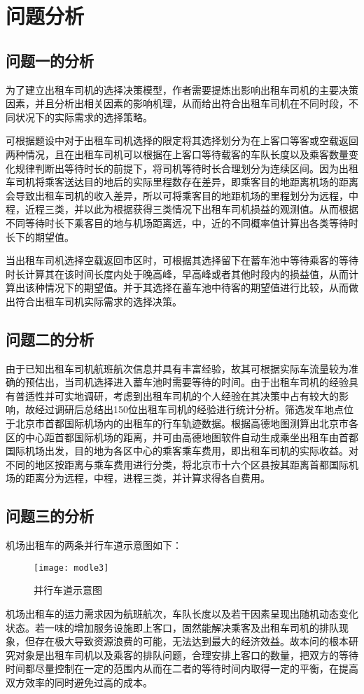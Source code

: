 \documentclass[withoutpreface,bwprint]{cumcmthesis} %
\begin{document}
\newpage
\section{问题分析}
\subsection{问题一的分析}
为了建立出租车司机的选择决策模型，作者需要提炼出影响出租车司机的主要决策因素，并且分析出相关因素的影响机理，从而给出符合出租车司机在不同时段，不同状况下的实际需求的选择策略。

可根据题设中对于出租车司机选择的限定将其选择划分为在上客口等客或空载返回两种情况，且在出租车司机可以根据在上客口等待载客的车队长度以及乘客数量变化规律判断出等待时长的前提下，将司机等待时长合理划分为连续区间。因为出租车司机将乘客送达目的地后的实际里程数存在差异，即乘客目的地距离机场的距离会导致出租车司机的收入差异，所以可将乘客目的地距机场的里程划分为远程，中程，近程三类，并以此为根据获得三类情况下出租车司机损益的观测值。从而根据不同等待时长下乘客目的地与机场距离远，中，近的不同概率值计算出各类等待时长下的期望值。

当出租车司机选择空载返回市区时，可根据其选择留下在蓄车池中等待乘客的等待时长计算其在该时间长度内处于晚高峰，早高峰或者其他时段内的损益值，从而计算出该种情况下的期望值。并于其选择在蓄车池中待客的期望值进行比较，从而做出符合出租车司机实际需求的选择决策。

\subsection{问题二的分析}
由于已知出租车司机航班航次信息并具有丰富经验，故其可根据实际车流量较为准确的预估出，当司机选择进入蓄车池时需要等待的时间。由于出租车司机的经验具有普适性并可实地调研，考虑到出租车司机的个人经验在其决策中占有较大的影响，故经过调研后总结出150位出租车司机的经验进行统计分析。筛选发车地点位于北京市首都国际机场内的出租车的行车轨迹数据。根据高德地图测算出北京市各区的中心距首都国际机场的距离，并可由高德地图软件自动生成乘坐出租车由首都国际机场出发，目的地为各区中心的乘客乘车费用，即出租车司机的实际收益。对不同的地区按距离与乘车费用进行分类，将北京市十六个区县按其距离首都国际机场的距离分为远程，中程，进程三类，并计算求得各自费用。

\subsection{问题三的分析}
机场出租车的两条并行车道示意图如下：

\begin{figure}[!htbp]
	\centering
	\texttt{[image: modle3]}
	\caption{并行车道示意图}
	\label{fig:circuit-diagram}
\end{figure}
\newpage
机场出租车的运力需求因为航班航次，车队长度以及若干因素呈现出随机动态变化状态。若一味的增加服务设施即上客口，固然能解决乘客及出租车司机的排队现象，但存在极大导致资源浪费的可能，无法达到最大的经济效益。故本问的根本研究对象是出租车司机以及乘客的排队问题，合理安排上客口的数量，把双方的等待时间都尽量控制在一定的范围内从而在二者的等待时间内取得一定的平衡，在提高双方效率的同时避免过高的成本。
\end{document}
